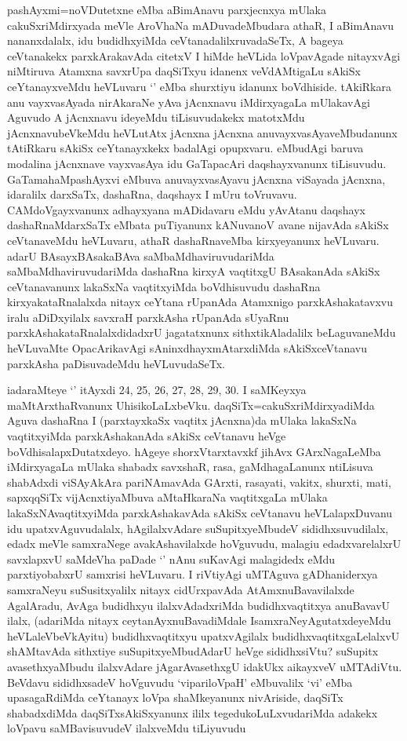 \begin{artha}
pashAyxmi=noVDutetxne eMba aBimAnavu parxjecnxya mUlaka cakuSxriMdirxyada meVle AroVhaNa mADuvadeMbudara athaR, I aBimAnavu nananxdalalx, idu budidhxyiMda ceVtanadalilxruvadaSeTx, A bageya ceVtanakekx parxkArakavAda citetxV I hiMde heVLida loVpavAgade nitayxvAgi niMtiruva Atamxna savxrUpa daqSiTxyu idanenx veVdAMtigaLu sAkiSx ceYtanayxveMdu heVLuvaru `\stext' eMba shurxtiyu idanunx boVdhiside. tAkiRkara anu vayxvasAyada nirAkaraNe yAva jAcnxnavu iMdirxyagaLa mUlakavAgi Aguvudo A jAcnxnavu ideyeMdu tiLisuvudakekx matotxMdu jAcnxnavubeVkeMdu heVLutAtx jAcnxna jAcnxna anuvayxvasAyaveMbudanunx tAtiRkaru sAkiSx ceYtanayxkekx badalAgi opupxvaru. \stext eMbudAgi baruva modalina jAcnxnave vayxvasAya idu GaTapacAri daqshayxvanunx tiLisuvudu. GaTamahaMpashAyxvi eMbuva anuvayxvasAyavu jAcnxna viSayada jAcnxna, idaralilx darxSaTx, dashaRna, daqshayx I mUru toVruvavu. CAMdoVgayxvanunx adhayxyana mADidavaru \stext eMdu yAvAtanu daqshayx dashaRnaMdarxSaTx eMbata puTiyanunx kANuvanoV avane nijavAda sAkiSx ceVtanaveMdu heVLuvaru, \stext athaR dashaRnaveMba kirxyeyanunx heVLuvaru. adarU BAsayxBAsakaBAva saMbaMdhaviruvudariMda saMbaMdhaviruvudariMda dashaRna kirxyA vaqtitxgU BAsakanAda sAkiSx ceVtanavanunx lakaSxNa vaqtitxyiMda boVdhisuvudu dashaRna kirxyakataRnalalxda nitayx ceYtana rUpanAda Atamxnigo parxkAshakatavxvu iralu aDiDxyilalx savxraH parxkAsha rUpanAda sUyaRnu parxkAshakataRnalalxdidadxrU jagatatxnunx sithxtikAladalilx beLaguvaneMdu heVLuvaMte OpacArikavAgi sAninxdhayxmAtarxdiMda sAkiSxceVtanavu parxkAsha paDisuvadeMdu heVLuvudaSeTx. 
\end{artha}%

\begin{artha}
iadaraMteye `\stext ' itAyxdi 24, 25, 26, 27, 28, 29, 30. I saMKeyxya maMtArxthaRvanunx UhisikoLaLxbeVku. daqSiTx=cakuSxriMdirxyadiMda Aguva dashaRna I (parxtayxkaSx vaqtitx jAcnxna)da mUlaka lakaSxNa vaqtitxyiMda parxkAshakanAda sAkiSx ceVtanavu heVge boVdhisalapxDutatxdeyo. hAgeye shorxVtarxtavxkf jihAvx GArxNagaLeMba iMdirxyagaLa mUlaka shabadx savxshaR, rasa, gaMdhagaLanunx ntiLisuva shabAdxdi viSAyAkAra pariNAmavAda GArxti, rasayati, vakitx, shurxti, mati, sapxqqSiTx vijAcnxtiyaMbuva aMtaHkaraNa vaqtitxgaLa mUlaka lakaSxNAvaqtitxyiMda parxkAshakavAda sAkiSx ceVtanavu heVLalapxDuvanu idu upatxvAguvudalalx, hAgilalxvAdare suSupitxyeMbudeV sididhxsuvudilalx, edadx meVle samxraNege avakAshavilalxde hoVguvudu, malagiu edadxvarelalxrU savxlapxvU saMdeVha paDade `\stext ' nAnu suKavAgi malagidedx eMdu parxtiyobabxrU samxrisi heVLuvaru. I riVtiyAgi uMTAguva gADhaniderxya samxraNeyu suSusitxyalilx nitayx cidUrxpavAda AtAmxnuBavavilalxde AgalAradu, AvAga budidhxyu ilalxvAdadxriMda budidhxvaqtitxya anuBavavU ilalx, (adariMda nitayx ceytanAyxnuBavadiMdale IsamxraNeyAgutatxdeyeMdu heVLaleVbeVkAyitu) budidhxvaqtitxyu upatxvAgilalx budidhxvaqtitxgaLelalxvU shAMtavAda sithxtiye suSupitxyeMbudAdarU heVge sididhxsiVtu? suSupitx avasethxyaMbudu ilalxvAdare jAgarAvasethxgU idakUkx aikayxveV uMTAdiVtu. BeVdavu sididhxsadeV hoVguvudu `vipariloVpaH' eMbuvalilx `vi' eMba upasagaRdiMda ceYtanayx loVpa shaMkeyanunx nivAriside, daqSiTx shabadxdiMda daqSiTxsAkiSxyanunx ililx tegedukoLuLxvudariMda adakekx loVpavu saMBavisuvudeV ilalxveMdu tiLiyuvudu
\end{artha}
